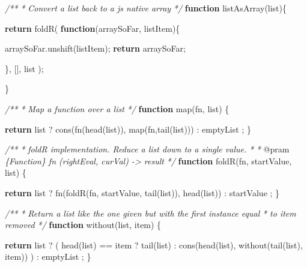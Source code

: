 \documentclass[12pt, ]{article}
\newenvironment{Shaded}{}{}
\newcommand{\KeywordTok}[1]{\textcolor[rgb]{0.00,0.44,0.13}{\textbf{{#1}}}}
\newcommand{\CommentTok}[1]{\textcolor[rgb]{0.38,0.63,0.69}{\textit{{#1}}}}
\newcommand{\OtherTok}[1]{\textcolor[rgb]{0.00,0.44,0.13}{{#1}}}
\newcommand{\FunctionTok}[1]{\textcolor[rgb]{0.02,0.16,0.49}{{#1}}}
\newcommand{\NormalTok}[1]{{#1}}
\begin{document}
\begin{Shaded}
\begin{Highlighting}[]
\CommentTok{/**}
\CommentTok{ * Convert a list back to a js native array}
\CommentTok{ */}
\KeywordTok{function} \FunctionTok{listAsArray}\NormalTok{(list)\{}

   \KeywordTok{return} \FunctionTok{foldR}\NormalTok{( }\KeywordTok{function}\NormalTok{(arraySoFar, listItem)\{}
      
      \OtherTok{arraySoFar}\NormalTok{.}\FunctionTok{unshift}\NormalTok{(listItem);}
      \KeywordTok{return} \NormalTok{arraySoFar;}
           
   \NormalTok{\}, [], list );}
   
\NormalTok{\}}

\CommentTok{/**}
\CommentTok{ * Map a function over a list }
\CommentTok{ */}
\KeywordTok{function} \FunctionTok{map}\NormalTok{(fn, list) \{}

   \KeywordTok{return} \NormalTok{list}
            \NormalTok{? }\FunctionTok{cons}\NormalTok{(}\FunctionTok{fn}\NormalTok{(}\FunctionTok{head}\NormalTok{(list)), }\FunctionTok{map}\NormalTok{(fn,}\FunctionTok{tail}\NormalTok{(list)))}
            \NormalTok{: emptyList}
            \NormalTok{;}
\NormalTok{\}}

\CommentTok{/**}
\CommentTok{ * foldR implementation. Reduce a list down to a single value.}
\CommentTok{ * }
\CommentTok{ * }\NormalTok{@pram}\CommentTok{ \{Function\} fn     (rightEval, curVal) -> result }
\CommentTok{ */}
\KeywordTok{function} \FunctionTok{foldR}\NormalTok{(fn, startValue, list) \{}
      
   \KeywordTok{return} \NormalTok{list }
            \NormalTok{? }\FunctionTok{fn}\NormalTok{(}\FunctionTok{foldR}\NormalTok{(fn, startValue, }\FunctionTok{tail}\NormalTok{(list)), }\FunctionTok{head}\NormalTok{(list))}
            \NormalTok{: startValue}
            \NormalTok{;}
\NormalTok{\}}

\CommentTok{/**}
\CommentTok{ * Return a list like the one given but with the first instance equal }
\CommentTok{ * to item removed }
\CommentTok{ */}
\KeywordTok{function} \FunctionTok{without}\NormalTok{(list, item) \{}
 
  \KeywordTok{return} \NormalTok{list  }
            \NormalTok{?  ( }\FunctionTok{head}\NormalTok{(list) == item }
                     \NormalTok{? }\FunctionTok{tail}\NormalTok{(list) }
                     \NormalTok{: }\FunctionTok{cons}\NormalTok{(}\FunctionTok{head}\NormalTok{(list), }\FunctionTok{without}\NormalTok{(}\FunctionTok{tail}\NormalTok{(list), item))}
               \NormalTok{) }
            \NormalTok{: emptyList}
            \NormalTok{;}
\NormalTok{\}}


\end{Highlighting}
\end{Shaded}
\end{document}
